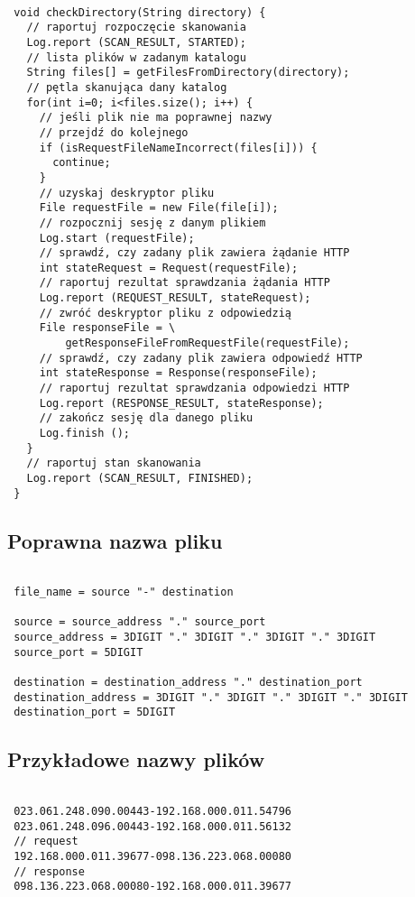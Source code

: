 \documentclass[a4paper,11pt]{report}
\begin{document}
\begin{lstlisting}

 void checkDirectory(String directory) {
   // raportuj rozpoczęcie skanowania
   Log.report (SCAN_RESULT, STARTED);
   // lista plików w zadanym katalogu
   String files[] = getFilesFromDirectory(directory);
   // pętla skanująca dany katalog
   for(int i=0; i<files.size(); i++) {
     // jeśli plik nie ma poprawnej nazwy
     // przejdź do kolejnego
     if (isRequestFileNameIncorrect(files[i])) {
       continue;
     }   
     // uzyskaj deskryptor pliku 
     File requestFile = new File(file[i]);  
     // rozpocznij sesję z danym plikiem
     Log.start (requestFile);
     // sprawdź, czy zadany plik zawiera żądanie HTTP
     int stateRequest = Request(requestFile);
     // raportuj rezultat sprawdzania żądania HTTP
     Log.report (REQUEST_RESULT, stateRequest);
     // zwróć deskryptor pliku z odpowiedzią
     File responseFile = \
         getResponseFileFromRequestFile(requestFile);
     // sprawdź, czy zadany plik zawiera odpowiedź HTTP
     int stateResponse = Response(responseFile);
     // raportuj rezultat sprawdzania odpowiedzi HTTP
     Log.report (RESPONSE_RESULT, stateResponse);
     // zakończ sesję dla danego pliku
     Log.finish ();
   }
   // raportuj stan skanowania
   Log.report (SCAN_RESULT, FINISHED);
 }

\end{lstlisting}

\subsection{Poprawna nazwa pliku}

\begin{lstlisting}

 file_name = source "-" destination
 
 source = source_address "." source_port
 source_address = 3DIGIT "." 3DIGIT "." 3DIGIT "." 3DIGIT
 source_port = 5DIGIT
 
 destination = destination_address "." destination_port
 destination_address = 3DIGIT "." 3DIGIT "." 3DIGIT "." 3DIGIT
 destination_port = 5DIGIT

\end{lstlisting}

\subsection{Przykładowe nazwy plików}

\begin{lstlisting}

 023.061.248.090.00443-192.168.000.011.54796
 023.061.248.096.00443-192.168.000.011.56132
 // request
 192.168.000.011.39677-098.136.223.068.00080
 // response
 098.136.223.068.00080-192.168.000.011.39677

\end{lstlisting}
\end{document}
